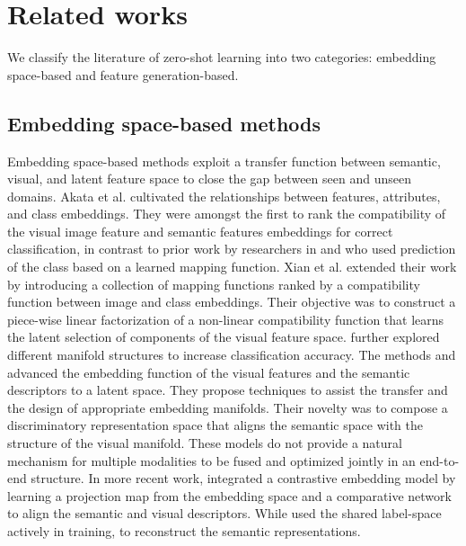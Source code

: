 \documentclass{article}
\begin{document}
\section{Related works}
We classify the literature of zero-shot learning into two categories: embedding space-based  and feature generation-based.

\subsection{Embedding space-based methods}
Embedding space-based methods exploit a transfer function between semantic, visual, and latent feature space to close the gap between seen and unseen domains. Akata et al. \cite{b1} cultivated the relationships between features, attributes, and class embeddings. They were amongst the first to rank the compatibility of the visual image feature and semantic features embeddings for correct classification, in contrast to prior work by researchers in \cite{b68} and \cite{b23} who used prediction of the class based on a learned mapping function.  Xian et al. \cite{b26} extended their work by introducing a collection of mapping functions ranked by a compatibility function between image and class embeddings. Their objective was to construct a piece-wise linear factorization of a non-linear compatibility function that learns the latent selection of components of the visual feature space.  \cite{b25, b27, b30} further explored different manifold structures to increase classification accuracy. The methods \cite{b14, b15, b16, b17} and \cite{b19} advanced the embedding function of the visual features and the semantic descriptors to a latent space. They propose techniques to assist the transfer and the design of appropriate embedding manifolds. Their novelty was to compose a discriminatory representation space that aligns the semantic space with the structure of the visual manifold. These models do not provide a natural mechanism for multiple modalities to be fused and optimized jointly in an end-to-end structure. In more recent work, \cite{b18} integrated a contrastive embedding model by learning a projection map from the embedding space and a comparative network to align the semantic and visual descriptors. While \cite{b70} used the shared label-space actively in training, to reconstruct the semantic representations. 
\end{document}
